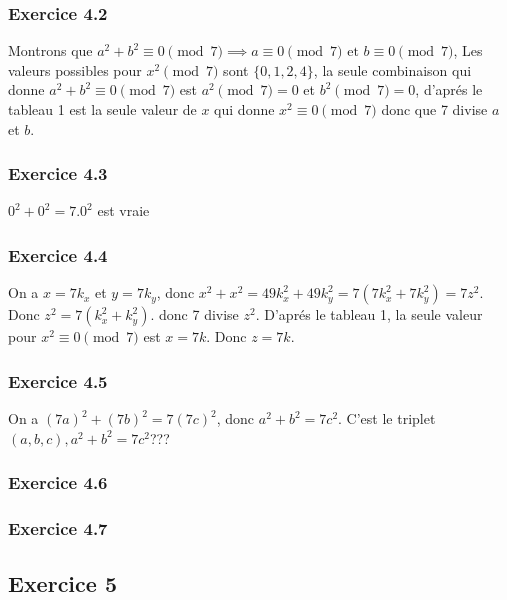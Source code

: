 \documentclass[]{book}
\theoremstyle{definition}
\begin{document}
\subsubsection*{Exercice 4.2}
Montrons que  $a^2 + b^2  \equiv 0 \pmod{7} \implies a \equiv 0 \pmod{7} \text{ et } b \equiv 0 \pmod{7}$, Les valeurs possibles pour $x^2 \pmod{7}$ sont $\{0,1,2,4\}$, la seule combinaison qui donne $a^2 + b^2 \equiv 0 \pmod{7}$ est $a^2 \pmod{7} = 0$ et $b^2 \pmod{7} = 0$, d'apr\'es le tableau 1 est la seule valeur de $x$ qui donne $x^2 \equiv 0 \pmod{7}$ donc que 7 divise $a$ et $b$.

\subsubsection*{Exercice 4.3}
$0^2 + 0^2 = 7.0^2$ est vraie

\subsubsection*{Exercice 4.4}
On a $x = 7k_x$ et $y=7k_y$, donc $x^2 + x^2 = 49k_x^2 + 49k_y^2 = 7(7k_x^2+7k_y^2) = 7z^2$. Donc $z^2 = 7(k_x^2 + k_y^2)$. donc 7 divise $z^2$. D'apr\'es le tableau 1, la seule valeur pour $x^2 \equiv 0 \pmod{7}$ est $x=7k$. Donc $z = 7k$.

\subsubsection*{Exercice 4.5}
On a $(7a)^2 + (7b)^2 = 7(7c)^2$, donc $a^2 + b^2 = 7c^2$. C'est le triplet $(a,b,c), a^2 + b^2 = 7c^2$???

\subsubsection*{Exercice 4.6}


\subsubsection*{Exercice 4.7}


\subsection*{Exercice 5}
\end{document}
